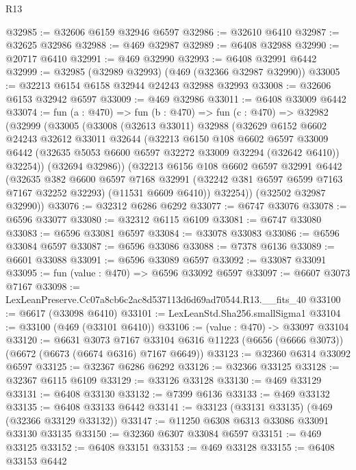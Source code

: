 \begin{lexlean}{R13}
\begin{coremodule}
@32985 := @32606 @6159 @32946 @6597
@32986 := @32610 @6410
@32987 := @32625 @32986
@32988 := @469 @32987
@32989 := @6408 @32988
@32990 := @20717 @6410
@32991 := @469 @32990
@32993 := @6408 @32991 @6442
@32999 := @32985 (@32989 @32993) (@469 (@32366 @32987 @32990))
@33005 := @32213 @6154 @6158 @32944 @24243 @32988 @32993
@33008 := @32606 @6153 @32942 @6597
@33009 := @469 @32986
@33011 := @6408 @33009 @6442
@33074 := fun (a : @470) =>
  fun (b : @470) =>
  fun (c : @470) =>
  @32982
    (@32999
      (@33005
        (@33008
          (@32613 @33011)
          @32988
          (@32629
            @6152
            @6602
            @24243
            @32612
            @33011
            @32644
            (@32213
              @6150
              @108
              @6602
              @6597
              @33009
              @6442
              (@32635 @5053 @6600 @6597 @32272 @33009 @32294 (@32642 @6410))
              @32254))
          (@32694 @32986))
        (@32213
          @6156
          @108
          @6602
          @6597
          @32991
          @6442
          (@32635
            @382
            @6600
            @6597
            @7168
            @32991
            (@32242 @381 @6597 @6599 @7163 @7167 @32252 @32293)
            (@11531 @6609 @6410))
          @32254))
      (@32502 @32987 @32990))
@33076 := @32312 @6286 @6292
@33077 := @6747 @33076
@33078 := @6596 @33077
@33080 := @32312 @6115 @6109
@33081 := @6747 @33080
@33083 := @6596 @33081 @6597
@33084 := @33078 @33083
@33086 := @6596 @33084 @6597
@33087 := @6596 @33086
@33088 := @7378 @6136
@33089 := @6601 @33088
@33091 := @6596 @33089 @6597
@33092 := @33087 @33091
@33095 := fun (value : @470) => @6596 @33092 @6597
@33097 := @6607 @3073 @7167
@33098 := LexLeanPreserve.Cc07a8cb6c2ac8d537113d6d69ad70544.R13.__fits_40
@33100 := @6617 (@33098 @6410)
@33101 := LexLeanStd.Sha256.smallSigma1
@33104 := @33100 (@469 (@33101 @6410))
@33106 := (value : @470) -> @33097 @33104
@33120 := @6631
    @3073
    @7167
    @33104
    @6316
    @11223
    (@6656 (@6666 @3073))
    (@6672 (@6673 (@6674 @6316) @7167 @6649))
@33123 := @32360 @6314 @33092 @6597
@33125 := @32367 @6286 @6292
@33126 := @32366 @33125
@33128 := @32367 @6115 @6109
@33129 := @33126 @33128
@33130 := @469 @33129
@33131 := @6408 @33130
@33132 := @7399 @6136
@33133 := @469 @33132
@33135 := @6408 @33133 @6442
@33141 := @33123 (@33131 @33135) (@469 (@32366 @33129 @33132))
@33147 := @11250 @6308 @6313 @33086 @33091 @33130 @33135
@33150 := @32360 @6307 @33084 @6597
@33151 := @469 @33125
@33152 := @6408 @33151
@33153 := @469 @33128
@33155 := @6408 @33153 @6442

\end{coremodule}
\end{lexlean}
